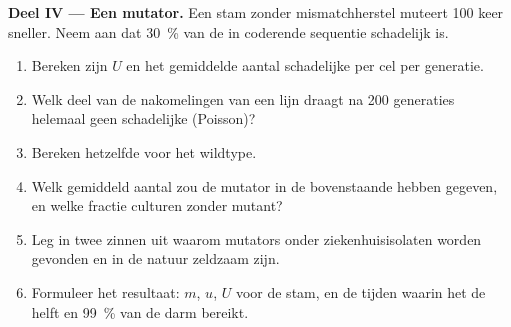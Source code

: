 \begin{problem}
\medskip
\noindent\textbf{Deel IV --- Een mutator.}
Een stam zonder mismatchherstel muteert \num{100} keer sneller.
Neem aan dat \qty{30}{\%} van de  in coderende sequentie
schadelijk is.
\begin{enumerate}[resume]
  \item Bereken zijn $U$ en het gemiddelde aantal schadelijke  per
        cel per generatie.
  \item Welk deel van de nakomelingen van een lijn draagt na \num{200}
        generaties helemaal geen schadelijke  (Poisson)?
  \item Bereken hetzelfde voor het wildtype.
  \item Welk gemiddeld aantal zou de mutator in de bovenstaande
         hebben gegeven, en welke fractie culturen zonder
        mutant?
  \item Leg in twee zinnen uit waarom mutators onder ziekenhuisisolaten
        worden gevonden en in de natuur zeldzaam zijn.
  \item Formuleer het resultaat: $m$, $u$, $U$ voor de stam, en de tijden
        waarin het  de helft en \qty{99}{\%} van de darm bereikt.
\end{enumerate}
\end{problem}
